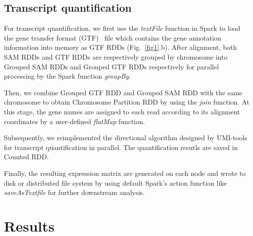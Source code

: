 \documentclass[conference]{IEEEtran}
\begin{document}
\subsection{Transcript quantification}
For transcript quantification, we first use the \textit{textFile} function in Spark to load the gene transfer format (GTF)~\cite{breese2013ngsutils} file which contains the gene annotation information into memory as GTF RDDs (Fig.~\ref{fig1}.b). 
After alignment, both SAM RDDs and GTF RDDs are respectively grouped by chromosome into Grouped SAM RDDs and Grouped GTF RDDs respectively for parallel processing by the Spark function \textit{groupBy}. 

Then, we combine Grouped GTF RDD and Grouped SAM RDD with the same chromosome to obtain Chromosome Partition RDD by using the \textit{join} function.
At this stage, the gene names are assigned to each read according to its alignment coordinates by a user-defined \textit{flatMap} function. 

Subsequently, we reimplemented the directional algorithm designed by UMI-tools for transcript quantification in parallel. The quantification resutls are saved in Counted RDD.

Finally, the resulting expression matrix are generated on each node and wrote to disk or distributed file system by using default Spark's action function like \textit{saveAsTextfile} for further downstream analysis. 

\section{Results}
\end{document}
